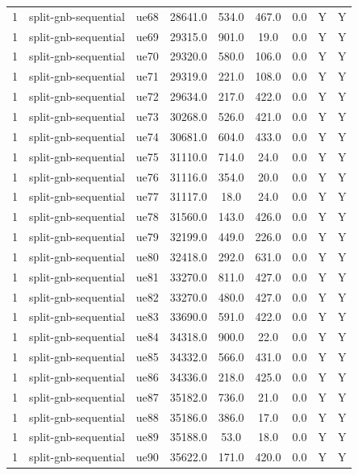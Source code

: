 \begin{table}[ht]
\begin{tabular}{|c|c|c|c|c|c|c|c|c|}
1 & split-gnb-sequential & ue68 & 28641.0 & 534.0 & 467.0 & 0.0 & Y & Y \\
1 & split-gnb-sequential & ue69 & 29315.0 & 901.0 & 19.0 & 0.0 & Y & Y \\
1 & split-gnb-sequential & ue70 & 29320.0 & 580.0 & 106.0 & 0.0 & Y & Y \\
1 & split-gnb-sequential & ue71 & 29319.0 & 221.0 & 108.0 & 0.0 & Y & Y \\
1 & split-gnb-sequential & ue72 & 29634.0 & 217.0 & 422.0 & 0.0 & Y & Y \\
1 & split-gnb-sequential & ue73 & 30268.0 & 526.0 & 421.0 & 0.0 & Y & Y \\
1 & split-gnb-sequential & ue74 & 30681.0 & 604.0 & 433.0 & 0.0 & Y & Y \\
1 & split-gnb-sequential & ue75 & 31110.0 & 714.0 & 24.0 & 0.0 & Y & Y \\
1 & split-gnb-sequential & ue76 & 31116.0 & 354.0 & 20.0 & 0.0 & Y & Y \\
1 & split-gnb-sequential & ue77 & 31117.0 & 18.0 & 24.0 & 0.0 & Y & Y \\
1 & split-gnb-sequential & ue78 & 31560.0 & 143.0 & 426.0 & 0.0 & Y & Y \\
1 & split-gnb-sequential & ue79 & 32199.0 & 449.0 & 226.0 & 0.0 & Y & Y \\
1 & split-gnb-sequential & ue80 & 32418.0 & 292.0 & 631.0 & 0.0 & Y & Y \\
1 & split-gnb-sequential & ue81 & 33270.0 & 811.0 & 427.0 & 0.0 & Y & Y \\
1 & split-gnb-sequential & ue82 & 33270.0 & 480.0 & 427.0 & 0.0 & Y & Y \\
1 & split-gnb-sequential & ue83 & 33690.0 & 591.0 & 422.0 & 0.0 & Y & Y \\
1 & split-gnb-sequential & ue84 & 34318.0 & 900.0 & 22.0 & 0.0 & Y & Y \\
1 & split-gnb-sequential & ue85 & 34332.0 & 566.0 & 431.0 & 0.0 & Y & Y \\
1 & split-gnb-sequential & ue86 & 34336.0 & 218.0 & 425.0 & 0.0 & Y & Y \\
1 & split-gnb-sequential & ue87 & 35182.0 & 736.0 & 21.0 & 0.0 & Y & Y \\
1 & split-gnb-sequential & ue88 & 35186.0 & 386.0 & 17.0 & 0.0 & Y & Y \\
1 & split-gnb-sequential & ue89 & 35188.0 & 53.0 & 18.0 & 0.0 & Y & Y \\
1 & split-gnb-sequential & ue90 & 35622.0 & 171.0 & 420.0 & 0.0 & Y & Y \\

\end{tabular}
\end{table}
